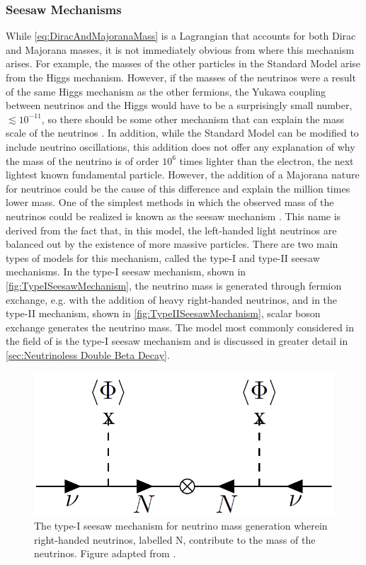\subsubsection{Seesaw Mechanisms}
\label{sssec:Seesaw Mechanism}
While \autoref{eq:DiracAndMajoranaMass} is a Lagrangian that accounts for both Dirac and Majorana masses, it is not immediately obvious from where this mechanism arises.
For example, the masses of the other particles in the Standard Model arise from the Higgs mechanism.
However, if the masses of the neutrinos were a result of the same Higgs mechanism as the other fermions, the Yukawa coupling between neutrinos and the Higgs would have to be a surprisingly small number, $\lesssim 10^{-11}$, so there should be some other mechanism that can explain the mass scale of the neutrinos \cite{Merle:2013gea}.
In addition, while the Standard Model can be modified to include neutrino oscillations, this addition does not offer any explanation of why the mass of the neutrino is of order $10^6$ times lighter than the electron, the next lightest known fundamental particle.
However, the addition of a Majorana nature for neutrinos could be the cause of this difference and explain the million times lower mass.
One of the simplest methods in which the observed mass of the neutrinos could be realized is known as the seesaw mechanism \cite{PhysRevD.22.2227}.
This name is derived from the fact that, in this model, the left-handed light neutrinos are balanced out by the existence of more massive particles.
There are two main types of models for this mechanism, called the type-I and type-II seesaw mechanisms.
In the type-I seesaw mechanism, shown in \autoref{fig:TypeISeesawMechanism}, the neutrino mass is generated through fermion exchange, e.g. with the addition of heavy right-handed neutrinos, and in the type-II mechanism, shown in \autoref{fig:TypeIISeesawMechanism}, scalar boson exchange generates the neutrino mass.
The model most commonly considered in the field of \zeronubb is the type-I seesaw mechanism and is discussed in greater detail in \autoref{sec:Neutrinoless Double Beta Decay}.
\begin{figure}[tbph]
\centering
\includegraphics[width=0.40\linewidth]{Figures/TypeISeesaw.png}
\caption[Type-I seesaw mechanism]
{The type-I seesaw mechanism for neutrino mass generation wherein right-handed neutrinos, labelled $\textrm{N}$, contribute to the mass of the neutrinos.
Figure adapted from \cite{MIRANDA2016436}.}
\label{fig:TypeISeesawMechanism}
\end{figure}

